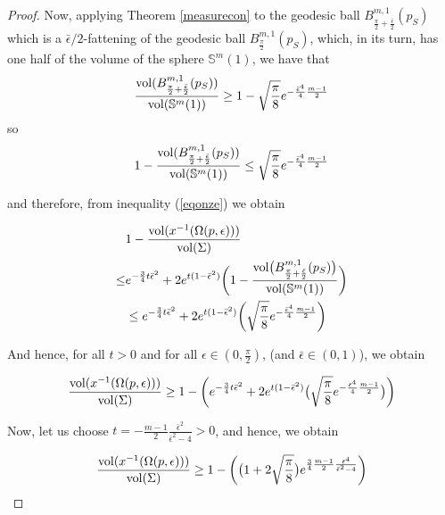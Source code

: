 \documentclass{amsart}
\theoremstyle{definition}
\theoremstyle{remark}
\newcommand{\ese}{\mathbb{S}}
\begin{document}
\begin{proof}
Now, applying Theorem \ref{measurecon} to the geodesic ball $B^{m,1}_{\frac{\pi}{2}+\frac{\bar\epsilon}{2}}(p_S)$ which is a $\bar\epsilon/2$-fattening of the geodesic ball $B^{m,1}_{\frac{\pi}{2}}(p_S)$, which, in its turn, has one half of the volume of the sphere $\ese^m(1)$, we have that
$$\frac{{\rm vol}(B^{m,1}_{\frac{\pi}{2}+\frac{\bar\epsilon}{2}}(p_S))}{{\rm vol}(\ese^m(1) )} \geq 1-\sqrt{\frac{\pi}{8}}e^{-\frac{\bar\epsilon^4}{4}\frac{m-1}{2}}$$
\noindent so
$$1-\frac{{\rm vol}(B^{m,1}_{\frac{\pi}{2}+\frac{\bar\epsilon}{2}}(p_S))}{{\rm vol}(\ese^m(1) )} \leq \sqrt{\frac{\pi}{8}}e^{-\frac{\bar\epsilon^4}{4}\frac{m-1}{2}}$$

\noindent and therefore, from inequality (\ref{eqonze}) we obtain


\begin{equation}\label{eqdotze}
 \begin{aligned}
&1-\frac{{\rm vol}(x^{-1}(\Omega(p,\epsilon)))}{{\rm vol}(\Sigma)}\\\leq & e^{-\frac{3}{4}t\bar\epsilon^2}+2e^{t(1-\bar\epsilon^2)}\bigg(1-\frac{{\rm vol}\big(B^{m,1}_{\frac{\pi}{2}+\frac{\bar\epsilon}{2}}(p_S) \big)}{{\rm vol}(\mathbb{S}^m(1))}\bigg)\\& \leq e^{-\frac{3}{4}t\bar\epsilon^2}+2e^{t(1-\bar\epsilon^2)}\bigg(  \sqrt{\frac{\pi}{8}}e^{-\frac{\bar\epsilon^4}{4}\frac{m-1}{2}}  \bigg)
\end{aligned}
\end{equation}



And hence, for all $t >0$ and for all $\epsilon \in (0,\frac{\pi}{2})$, (and $\bar\epsilon \in (0,1)$), we obtain

\begin{equation}\label{eqtretze}
\frac{{\rm vol}(x^{-1}(\Omega(p,\epsilon)))}{{\rm vol}(\Sigma)}\\\geq 1- \bigg(e^{-\frac{3}{4}t\bar\epsilon^2}+2e^{t(1-\bar\epsilon^2)}\big(  \sqrt{\frac{\pi}{8}}e^{-\frac{\bar\epsilon^4}{4}\frac{m-1}{2}}  \big)\bigg)
\end{equation}

Now, let us choose $t=-\frac{m-1}{2}\frac{\bar\epsilon^2}{\bar\epsilon^2-4} >0$, and hence, we obtain

\begin{equation}\label{eqcatorze}
\frac{{\rm vol}(x^{-1}(\Omega(p,\epsilon)))}{{\rm vol}(\Sigma)}\\\geq 1- \bigg(\big( 1+2 \sqrt{\frac{\pi}{8}} \big)e^{\frac{3}{4}\frac{m-1}{2}\frac{\bar\epsilon^4}{\bar\epsilon^2-4}}\bigg)
\end{equation}




\end{proof}
\end{document}
